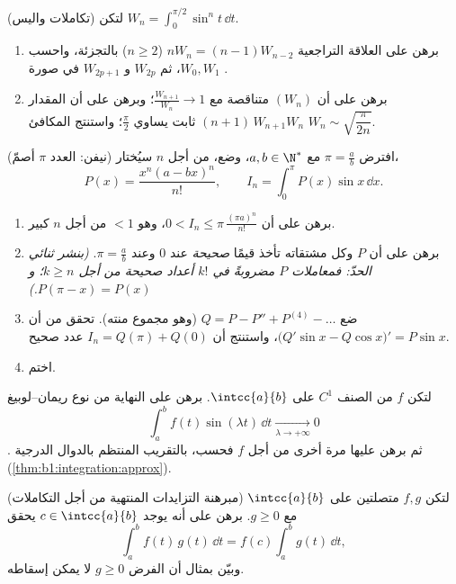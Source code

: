 \begin{exercise}[$\star\star\star$]\label{exo:b1:integration:8}
(تكاملات واليس) لتكن $W_n = \int_0^{\pi/2} \sin^n t\,\dd t$.
\begin{enumerate}
  \item برهن على العلاقة التراجعية $n W_n = (n-1) W_{n-2}$ ($n \geq 2$)
        بالتجزئة، واحسب $W_0, W_1$، ثم $W_{2p}$ و $W_{2p+1}$
        في صورة .
  \item برهن على أن $(W_n)$ متناقصة مع $\frac{W_{n+1}}{W_n}
        \to 1$؛ وبرهن على أن المقدار $(n+1)\,W_{n+1} W_n$
        ثابت يساوي $\frac\pi2$؛ واستنتج المكافئ
        $W_n \sim \sqrt{\dfrac{\pi}{2n}}$.
\end{enumerate}
\end{exercise}

\begin{exercise}[$\star\star\star$]\label{exo:b1:integration:9}
(نيفن: العدد $\pi$ أصمّ) افترض $\pi = \frac ab$ مع $a, b \in
\N^*$، وضع، من أجل $n$ سيُختار،
\[
P(x) = \frac{x^n (a - bx)^n}{n!},
\qquad
I_n = \int_0^{\pi} P(x)\sin x\, \dd x .
\]
\begin{enumerate}
  \item برهن على أن $0 < I_n \leq \pi\,\frac{(\pi a)^n}{n!}$، وهو
        $< 1$ من أجل $n$ كبير.
  \item برهن على أن $P$ وكل مشتقاته تأخذ قيمًا \emph{صحيحة}
        عند $0$ وعند $\pi = \frac ab$. \emph{(بنشر ثنائي
        الحدّ: فمعاملات $P$ مضروبةً في $k!$ أعداد صحيحة
        من أجل $k \geq n$؛ و $P(\pi - x) = P(x)$.)}
  \item ضع $Q = P - P'' + P^{(4)} - \dots$ (وهو مجموع منته). تحقق
        من أن $\bigl(Q'\sin x - Q\cos x\bigr)' = P \sin x$، واستنتج
        أن $I_n = Q(\pi) + Q(0)$ عدد صحيح.
  \item اختم.
\end{enumerate}
\end{exercise}

\begin{exercise}[$\star\star\star$]\label{exo:b1:integration:10}
لتكن $f$ من الصنف $C^1$ على $\intcc{a}{b}$. برهن على النهاية من نوع
ريمان--لوبيغ
\[
\int_a^b f(t)\sin(\lambda t)\,\dd t \xrightarrow[\lambda \to
+\infty]{} 0
\]
. ثم برهن عليها مرة أخرى من أجل $f$  فحسب،
بالتقريب المنتظم بالدوال الدرجية
(\cref{thm:b1:integration:approx}).
\end{exercise}

\begin{exercise}[$\star\star$]\label{exo:b1:integration:11}
(مبرهنة التزايدات المنتهية من أجل التكاملات) لتكن $f, g$ متصلتين على
$\intcc{a}{b}$ مع $g \geq 0$. برهن على أنه يوجد $c \in
\intcc{a}{b}$ يحقق
\[
\int_a^b f(t)\,g(t)\,\dd t = f(c)\int_a^b g(t)\,\dd t ,
\]
وبيّن بمثال أن الفرض $g \geq 0$ لا يمكن
إسقاطه.
\end{exercise}

